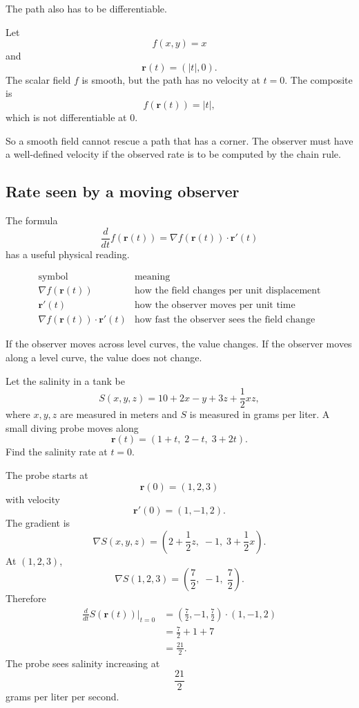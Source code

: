 The path also has to be differentiable.

\begin{example}
Let
\[
    f(x,y)=x
\]
and
\[
    \mathbf r(t)=(|t|,0).
\]
The scalar field \(f\) is smooth, but the path has no velocity at \(t=0\).  The composite
is
\[
    f(\mathbf r(t))=|t|,
\]
which is not differentiable at \(0\).

So a smooth field cannot rescue a path that has a corner.  The observer must have a
well-defined velocity if the observed rate is to be computed by the chain rule.
\end{example}

\subsection{Rate seen by a moving observer}

The formula
\[
    \frac{d}{dt}f(\mathbf r(t))
    =
    \nabla f(\mathbf r(t))\cdot\mathbf r'(t)
\]
has a useful physical reading.

\[
\begin{array}{c|c}
\text{symbol} & \text{meaning} \\ \hline
\nabla f(\mathbf r(t)) & \text{how the field changes per unit displacement}\\[1mm]
\mathbf r'(t) & \text{how the observer moves per unit time}\\[1mm]
\nabla f(\mathbf r(t))\cdot\mathbf r'(t) & \text{how fast the observer sees the field change}
\end{array}
\]

If the observer moves across level curves, the value changes.  If the observer moves
along a level curve, the value does not change.

\begin{example}
Let the salinity in a tank be
\[
    S(x,y,z)=10+2x-y+3z+\frac12xz,
\]
where \(x,y,z\) are measured in meters and \(S\) is measured in grams per liter.
A small diving probe moves along
\[
    \mathbf r(t)=(1+t,\;2-t,\;3+2t).
\]
Find the salinity rate at \(t=0\).

The probe starts at
\[
    \mathbf r(0)=(1,2,3)
\]
with velocity
\[
    \mathbf r'(0)=(1,-1,2).
\]
The gradient is
\[
    \nabla S(x,y,z)
    =
    \left(2+\frac12z,\;-1,\;3+\frac12x\right).
\]
At \((1,2,3)\),
\[
    \nabla S(1,2,3)
    =
    \left(\frac72,\;-1,\;\frac72\right).
\]
Therefore
\[
\begin{aligned}
    \frac{d}{dt}S(\mathbf r(t))\bigg|_{t=0}
    &=
    \left(\frac72,-1,\frac72\right)\cdot(1,-1,2)\\
    &=
    \frac72+1+7\\
    &=
    \frac{21}{2}.
\end{aligned}
\]
The probe sees salinity increasing at
\[
    \frac{21}{2}
\]
grams per liter per second.
\end{example}

